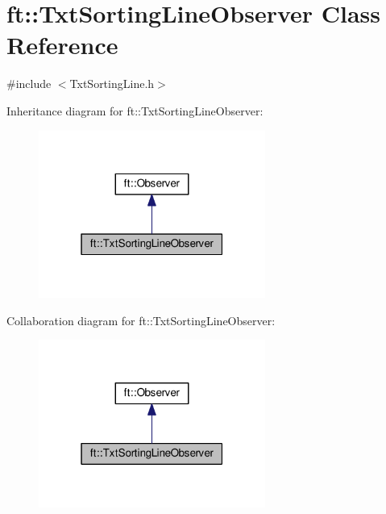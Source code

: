 \hypertarget{classft_1_1_txt_sorting_line_observer}{}\section{ft\+:\+:Txt\+Sorting\+Line\+Observer Class Reference}
\label{classft_1_1_txt_sorting_line_observer}


{\ttfamily \#include $<$Txt\+Sorting\+Line.\+h$>$}



Inheritance diagram for ft\+:\+:Txt\+Sorting\+Line\+Observer\+:
\nopagebreak
\begin{figure}[H]
\begin{center}
\leavevmode
\includegraphics[width=211pt]{classft_1_1_txt_sorting_line_observer__inherit__graph}
\end{center}
\end{figure}


Collaboration diagram for ft\+:\+:Txt\+Sorting\+Line\+Observer\+:
\nopagebreak
\begin{figure}[H]
\begin{center}
\leavevmode
\includegraphics[width=211pt]{classft_1_1_txt_sorting_line_observer__coll__graph}
\end{center}
\end{figure}
